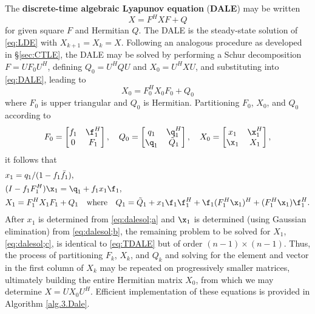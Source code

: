 The {\bf discrete-time algebraic Lyapunov equation} ({\bf DALE}) may be written
\begin{equation}
X = F^H X F + Q
\label{eq:DALE}
\end{equation}
for given square $F$ and Hermitian $Q$.  The DALE is the steady-state solution of \eqref{eq:LDE} with $X_{k+1}=X_k=X$.
Following an analogous procedure as developed in \S \ref{sec:CTLE}, the DALE may be solved by performing a Schur decomposition $F=U F_0 U^{H}$,
defining $Q_0=U^H Q U$ and $X_0=U^H X U$, and substituting into \eqref{eq:DALE}, leading to 
\begin{equation}
X_0 = F_0^H X_0 F_0 + Q_0
\label{eq:TDALE}
\end{equation}
where $F_0$ is upper triangular and $Q_0$ is Hermitian.  Partitioning $F_0$, $X_0$, and $Q_0$ according to
\begin{equation*}
   F_0=\begin{bmatrix} f_1 & \f_1^H \\ 0 & F_1 \end{bmatrix}, \quad
   Q_0=\begin{bmatrix} q_1 & \q_1^H \\ \q_1 & \tilde Q_1 \end{bmatrix}, \quad
   X_0=\begin{bmatrix} x_1 & \x_1^H \\ \x_1 & X_1 \end{bmatrix},
\end{equation*}
it follows that
\begin{subequations}
\label{eq:dalesol}
\begin{align}
 &x_1 = q_1 / (1-f_1 \bar f_1),     \label{eq:dalesol;a} \\
 &(I - f_1 F_1^H) \x_1 = \q_1 + f_1 x_1 \f_1, \label{eq:dalesol;b}\\
 &X_1 = F_1^H X_1 F_1 + Q_1 \quad \textrm{where} \quad Q_1 = \tilde Q_1 + x_1 \f_1 \f_1^H + \f_1 (F_1^H \x_1)^H + (F_1^H \x_1) \f_1^H.  \label{eq:dalesol;c}
\end{align}
\end{subequations}
After $x_1$ is determined from \eqref{eq:dalesol;a} and $\x_1$ is determined (using Gaussian elimination) from \eqref{eq:dalesol;b},
the remaining problem to be solved for $X_1$, \eqref{eq:dalesol;c}, is identical to \eqref{eq:TDALE} but of order $(n-1)\times (n-1)$.  
Thus, the process of partitioning $F_k$, $X_k$, and $Q_k$ and solving for the element and vector in the first
column of $X_k$ may be repeated on progressively smaller matrices, ultimately building
the entire Hermitian matrix $X_0$, from which we may determine $X = U X_0 U^H$.  Efficient implementation of these equations
is provided in Algorithm \ref{alg.3.Dale}.

